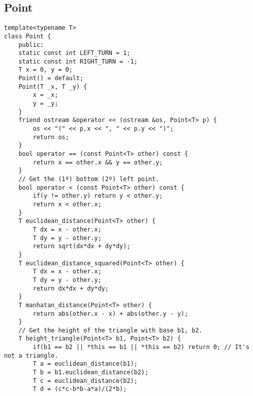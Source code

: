 \documentclass[a4paper]{article}
\begin{document}
\subsection*{Point}
\begin{multicols}{2}
\begin{verbatim}
template<typename T>
class Point {
    public:
    static const int LEFT_TURN = 1;
    static const int RIGHT_TURN = -1;
    T x = 0, y = 0;
    Point() = default;
    Point(T _x, T _y) {
        x = _x;
        y = _y;
    }
    friend ostream &operator << (ostream &os, Point<T> p) {
        os << "(" << p.x << ", " << p.y << ")";
        return os;
    }
    bool operator == (const Point<T> other) const {
        return x == other.x && y == other.y;
    }
    // Get the (1º) bottom (2º) left point.
    bool operator < (const Point<T> other) const {
        if(y != other.y) return y < other.y;
        return x < other.x;
    }
    T euclidean_distance(Point<T> other) {
        T dx = x - other.x;
        T dy = y - other.y;
        return sqrt(dx*dx + dy*dy);
    }
    T euclidean_distance_squared(Point<T> other) {
        T dx = x - other.x;
        T dy = y - other.y;
        return dx*dx + dy*dy;
    }
    T manhatan_distance(Point<T> other) {
        return abs(other.x - x) + abs(other.y - y);
    }
    // Get the height of the triangle with base b1, b2.
    T height_triangle(Point<T> b1, Point<T> b2) {
        if(b1 == b2 || *this == b1 || *this == b2) return 0; // It's not a triangle.
        T a = euclidean_distance(b1);
        T b = b1.euclidean_distance(b2);
        T c = euclidean_distance(b2);
        T d = (c*c-b*b-a*a)/(2*b);
        

\end{verbatim}
\end{multicols}
\end{document}
